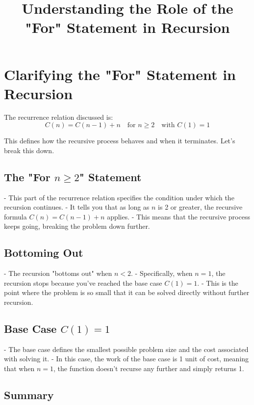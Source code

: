 \documentclass{article}
\title{Understanding the Role of the "For" Statement in Recursion}
\author{}
\date{}
\begin{document}
\maketitle

\section{Clarifying the "For" Statement in Recursion}

The recurrence relation discussed is:
\[
C(n) = C(n-1) + n \quad \text{for } n \geq 2 \quad \text{with } C(1) = 1
\]

This defines how the recursive process behaves and when it terminates. Let's break this down.

\subsection{The "For \( n \geq 2 \)" Statement}

- This part of the recurrence relation specifies the condition under which the recursion continues. 
- It tells you that as long as \( n \) is 2 or greater, the recursive formula \( C(n) = C(n-1) + n \) applies. 
- This means that the recursive process keeps going, breaking the problem down further.

\subsection{Bottoming Out}

- The recursion "bottoms out" when \( n < 2 \). 
- Specifically, when \( n = 1 \), the recursion stops because you've reached the base case \( C(1) = 1 \). 
- This is the point where the problem is so small that it can be solved directly without further recursion.

\subsection{Base Case \( C(1) = 1 \)}

- The base case defines the smallest possible problem size and the cost associated with solving it. 
- In this case, the work of the base case is 1 unit of cost, meaning that when \( n = 1 \), the function doesn't recurse any further and simply returns 1.

\subsection{Summary}
\end{document}
